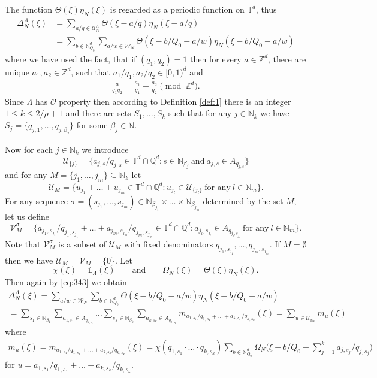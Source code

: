 \documentclass[a4paper,oneside]{amsart}
\theoremstyle{plain}
\theoremstyle{definition}
\numberwithin{equation}{section}
\theoremstyle{plain}
\newcommand{\ZZ}{\mathbb{Z}}
\newcommand{\TT}{\mathbb{T}}
\newcommand{\NN}{\mathbb{N}}
\newcommand{\QQ}{\mathbb{Q}}
\newcommand{\ind}[1]{{\mathds{1}_{{#1}}}}
\newcommand{\8}{\infty}
\begin{document}
The function $\Theta(\xi)\eta_N(\xi)$ is regarded as a periodic function on $\TT^d$, thus
\begin{align*}
  \Delta_N^{\Lambda}(\xi)&=\sum_{a/q\in \mathscr{U}_N^\Lambda}\Theta(\xi-a/q)\eta_N(\xi-a/q)\\
  &= \sum_{b\in\NN_{Q_0}^d}\sum_{a/w\in
    \mathscr{W}_N}\Theta(\xi-b/Q_0-a/w)\eta_N(\xi-b/Q_0-a/w)
\end{align*}
where we have used the fact, that if $(q_1, q_2)=1$ then for every
$a\in\ZZ^d$, there are unique $a_1, a_2\in\ZZ^d$, such that $a_1/q_1, a_2/q_2\in[0, 1)^d$ and
\begin{align}
  \label{eq:343}
\frac{a}{q_1q_2}=\frac{a_1}{q_1}+\frac{a_2}{q_2} \pmod{\ZZ^d}.  
\end{align}
Since $\Lambda$ has $\mathcal O$ property then according to
Definition \ref{def:1} there is an integer $1\le k\le 2/\rho+1$ and
there are sets $S_1, \ldots, S_k$ such that for any $j\in\NN_k$ we
have $S_j=\{q_{j, 1},\ldots,q_{j, \beta_j} \}$ for some $\beta_j\in\NN$. 

 Now for each $j\in\NN_k$ we introduce 
\[
\mathcal U_{\{j\}}=\big\{a_{j, s}/q_{j, s}\in\TT^d\cap \QQ^d: s\in\NN_{\beta_j}\ \text{and}\ a_{j, s}\in A_{q_{j, s}}\big\}
\] 
and for any $M=\{j_1, \ldots, j_m\}\subseteq \NN_k$ let
\[
\mathcal U_M=\big\{u_{j_1}+\ldots+u_{j_m}\in\TT^d\cap \QQ^d:
u_{j_l}\in \mathcal U_{\{j_l\}}\ \text{for any}\ l\in\NN_m\big\}.
\]
For any sequence $\sigma=(s_{j_1}, \ldots, s_{j_m})\in
\NN_{\beta_{j_1}}\times\ldots\times\NN_{\beta_{j_m}}$ determined by
the set $M$, let us define 
\[
\mathcal V_M^{\sigma}=\big\{a_{j_1, s_{j_1}}/q_{j_1, s_{j_1}}+\ldots+
a_{j_m, s_{j_m}}/q_{j_m, s_{j_m}}\in\TT^d\cap \QQ^d: a_{j_l, s_{j_l}}\in A_{q_{j_l, s_{j_l}}}\ \text{for any}\ l\in\NN_m\big\}.
\]
Note that $\mathcal V_M^{\sigma}$ is a subset of $\mathcal U_M$ with
fixed denominators $q_{j_1, s_{j_1}},\ldots,q_{j_m, s_{j_m}}$. If
$M=\emptyset$ then we have $\mathcal U_M=\mathcal V_M=\{0\}$. Let
\[
\chi(\xi)=\ind{\Lambda}(\xi) \qquad \text{and} \qquad \Omega_N(\xi)=\Theta(\xi)\eta_N(\xi).
\]
Then again by \eqref{eq:343} we obtain
\begin{multline}
\label{eq:13}
  \Delta_N^\Lambda(\xi)=
\sum_{a/w\in \mathscr{W}_N}\sum_{b\in\NN_{Q_0}^d}\Theta(\xi-b/Q_0-a/w)\eta_N(\xi-b/Q_0-a/w)\\
=\sum_{s_1\in\NN_{\beta_1}}\sum_{a_{1, s_1}\in A_{q_{1, s_1}}}\ldots\sum_{s_k\in\NN_{\beta_k}}
\sum_{a_{k, s_k}\in A_{q_{k, s_k}}}
m_{a_{1, s_1}/q_{1, s_1}+\ldots+a_{k, s_k}/q_{k, s_k} }(\xi)=\sum_{u\in \mathcal U_{\NN_k}}m_{u}(\xi)
\end{multline}
where 
\begin{align}
\label{eq:27}
  m_{u}(\xi)=m_{a_{1, s_1}/q_{1, s_1}+\ldots+a_{k, s_k}/q_{k, s_k} }(\xi)=\chi(q_{1, s_1}\cdot\ldots\cdot q_{k,
    s_k})\sum_{b\in\NN_{Q_0}^d}
  \Omega_N\Big(\xi-b/Q_0-\sum_{j=1}^ka_{j, s_j}/q_{j, s_j}\Big)
\end{align}
 for $u= a_{1, s_1}/q_{1, s_1}+\ldots+a_{k, s_k}/q_{k, s_k}$.
\end{document}
